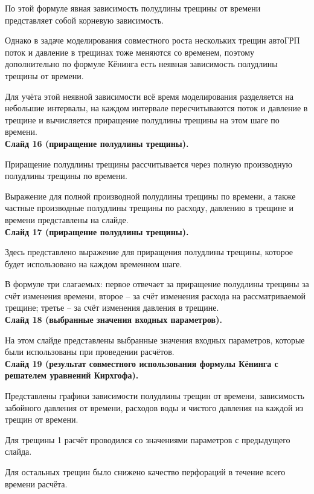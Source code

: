 \documentclass[a4paper, 12pt]{article}
\begin{document}
По этой формуле явная зависимость полудлины трещины от времени представляет собой корневую зависимость.

Однако в задаче моделирования совместного роста нескольких трещин автоГРП поток и давление в трещинах тоже меняются со временем, поэтому дополнительно по формуле Кёнинга есть неявная зависимость полудлины трещины от времени.

Для учёта этой неявной зависимости всё время моделирования разделяется на небольшие интервалы, на каждом интервале пересчитываются поток и давление в трещине и вычисляется приращение полудлины трещины на этом шаге по времени.\\

\textbf{Слайд 16 (приращение полудлины трещины).}

Приращение полудлины трещины рассчитывается через полную производную полудлины трещины по времени.

Выражение для полной производной полудлины трещины по времени, а также частные производные полудлины трещины по расходу, давлению в трещине и времени представлены на слайде.\\

\textbf{Слайд 17 (приращение полудлины трещины).}

Здесь представлено выражение для приращения полудлины трещины, которое будет использовано на каждом временном шаге.

В формуле три слагаемых: первое отвечает за приращение полудлины трещины за счёт изменения времени, второе -- за счёт изменения расхода на рассматриваемой трещине; третье -- за счёт изменения давления в трещине.\\

\textbf{Слайд 18 (выбранные значения входных параметров).}

На этом слайде представлены выбранные значения входных параметров, которые были использованы при проведении расчётов.\\

\textbf{Слайд 19 (результат совместного использования формулы Кёнинга с решателем уравнений Кирхгофа).}

Представлены графики зависимости полудлины трещин от времени, зависимость забойного давления от времени, расходов воды и чистого давления на каждой из трещин от времени. 

Для трещины 1 расчёт проводился со значениями параметров с предыдущего слайда.

Для остальных трещин было снижено качество перфораций в течение всего времени расчёта.\\
\end{document}
